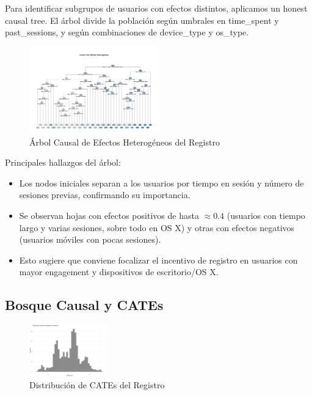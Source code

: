 \documentclass[conference]{IEEEtran}
\begin{document}
Para identificar subgrupos de usuarios con efectos distintos, aplicamos un honest causal tree.
El árbol divide la población según umbrales en time\_spent y past\_sessions, y según combinaciones de device\_type y os\_type.

\begin{figure}[h]
    \centering
    \includegraphics[width=0.5\textwidth]{figures/causal_tree_unpruned.jpg}
    \caption{Árbol Causal de Efectos Heterogéneos del Registro}
    \label{fig:arbol_causal}
\end{figure}

Principales hallazgos del árbol:

\begin{itemize}
  \item Los nodos iniciales separan a los usuarios por tiempo en sesión y número de sesiones previas, confirmando su importancia.
  \item Se observan hojas con efectos positivos de hasta $\approx 0.4$ (usuarios con tiempo largo y varias sesiones, sobre todo en OS X) y otras con efectos negativos (usuarios móviles con pocas sesiones).
  \item Esto sugiere que conviene focalizar el incentivo de registro en usuarios con mayor engagement y dispositivos de escritorio/OS X.
\end{itemize}


\subsection{Bosque Causal y CATEs}

\begin{figure}
    \centering
    \includegraphics[width=0.3\textwidth]{figures/distribucion_efectos_heterogeneos.jpg}
    \caption{Distribución de CATEs del Registro}
    \label{fig:cate_distribution}
\end{figure}
\end{document}
